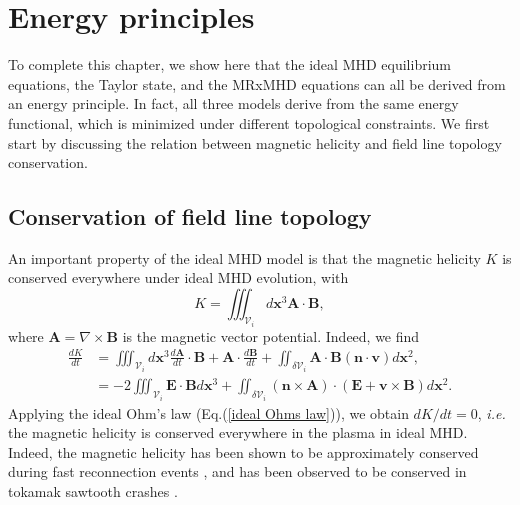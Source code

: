 \documentclass[my_thesis.tex]{subfiles}
\begin{document}
\section{Energy principles}
To complete this chapter, we show here that the ideal MHD equilibrium equations, the Taylor state, and the MRxMHD equations can all be derived from an energy principle. In fact, all three models derive from the same energy functional, which is minimized under different topological constraints. We first start by discussing the relation between magnetic helicity and field line topology conservation.

\subsection{Conservation of field line topology}
An important property of the ideal MHD model is that the magnetic helicity $K$ is conserved everywhere under ideal MHD evolution, with
\begin{equation}
	K = \iiint_{\mathcal{V}_i} d\mathbf{x}^3 \mathbf{A} \cdot \mathbf{B},
\end{equation}
where $\mathbf{A}=\nabla\times\mathbf{B}$ is the magnetic vector potential. Indeed, we find
\begin{align}
	\frac{dK}{dt} &= \iiint_{\mathcal{V}_i} d\mathbf{x}^3 \frac{d\mathbf{A}}{dt}\cdot\mathbf{B} + \mathbf{A}\cdot\frac{d\mathbf{B}}{dt} + \iint_{\delta\mathcal{V}_i} \mathbf{A}\cdot\mathbf{B}(\mathbf{n}\cdot\mathbf{v})d\mathbf{x}^2, \\
	&= -2\iiint_{\mathcal{V}_i}\mathbf{E}\cdot\mathbf{B} d\mathbf{x}^3 + \iint_{\delta\mathcal{V}_i}(\mathbf{n}\times\mathbf{A})\cdot(\mathbf{E}+\mathbf{v}\times\mathbf{B})d\mathbf{x}^2.
\end{align}
Applying the ideal Ohm's law (Eq.(\ref{ideal Ohms law})), we obtain $dK/dt = 0$, \textit{i.e.} the magnetic helicity is conserved everywhere in the plasma in ideal MHD. Indeed, the magnetic helicity has been shown to be approximately conserved during fast reconnection events \citep{bergerIntroductionMagneticHelicity1999}, and has been observed to be conserved in tokamak sawtooth crashes \citep{Heidbrink2000}. 
\end{document}
